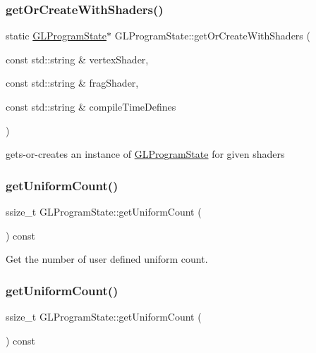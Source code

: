 \subsubsection{\texorpdfstring{get\+Or\+Create\+With\+Shaders()}{getOrCreateWithShaders()}\hspace{0.1cm}{\footnotesize\ttfamily [2/2]}}
{\footnotesize\ttfamily static \hyperlink{classGLProgramState}{G\+L\+Program\+State}$\ast$ G\+L\+Program\+State\+::get\+Or\+Create\+With\+Shaders (\begin{DoxyParamCaption}\item[{const std\+::string \&}]{vertex\+Shader,  }\item[{const std\+::string \&}]{frag\+Shader,  }\item[{const std\+::string \&}]{compile\+Time\+Defines }\end{DoxyParamCaption})\hspace{0.3cm}{\ttfamily [static]}}

gets-\/or-\/creates an instance of \hyperlink{classGLProgramState}{G\+L\+Program\+State} for given shaders \mbox{\label{classGLProgramState_abdad543ece51ec3b98ff59d4bc4e75f6}} 
\subsubsection{\texorpdfstring{get\+Uniform\+Count()}{getUniformCount()}\hspace{0.1cm}{\footnotesize\ttfamily [1/2]}}
{\footnotesize\ttfamily ssize\+\_\+t G\+L\+Program\+State\+::get\+Uniform\+Count (\begin{DoxyParamCaption}{ }\end{DoxyParamCaption}) const\hspace{0.3cm}{\ttfamily [inline]}}

Get the number of user defined uniform count. \mbox{\label{classGLProgramState_abdad543ece51ec3b98ff59d4bc4e75f6}} 
\subsubsection{\texorpdfstring{get\+Uniform\+Count()}{getUniformCount()}\hspace{0.1cm}{\footnotesize\ttfamily [2/2]}}
{\footnotesize\ttfamily ssize\+\_\+t G\+L\+Program\+State\+::get\+Uniform\+Count (\begin{DoxyParamCaption}{ }\end{DoxyParamCaption}) const\hspace{0.3cm}{\ttfamily [inline]}}

